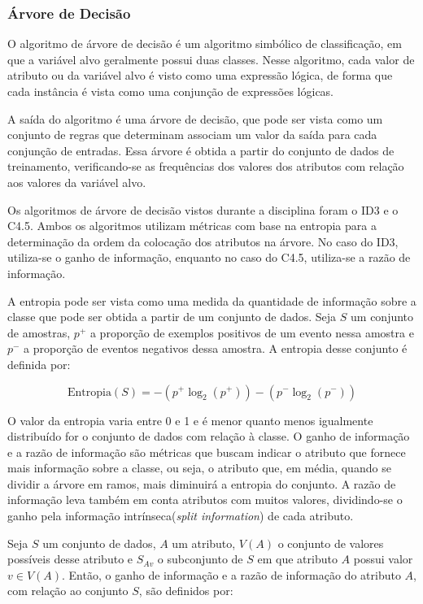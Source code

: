 \documentclass{article}
\begin{document}
\subsubsection{Árvore de Decisão}

O algoritmo de árvore de decisão é um algoritmo simbólico de classificação, em que a variável alvo geralmente possui duas classes. Nesse algoritmo, cada valor de atributo ou da variável alvo é visto como uma expressão lógica, de forma que cada instância é vista como uma conjunção de expressões lógicas.

A saída do algoritmo é uma árvore de decisão, que pode ser vista como um conjunto de regras que determinam associam um valor da saída para cada conjunção de entradas. Essa árvore é obtida a partir do conjunto de dados de treinamento, verificando-se as frequências dos valores dos atributos com relação aos valores da variável alvo.

Os algoritmos de árvore de decisão vistos durante a disciplina foram o ID3 e o C4.5. Ambos os algoritmos utilizam métricas com base na entropia para a determinação da ordem da colocação dos atributos na árvore. No caso do ID3, utiliza-se o ganho de informação, enquanto no caso do C4.5, utiliza-se a razão de informação.

A entropia pode ser vista como uma medida da quantidade de informação sobre a classe que pode ser obtida a partir de um conjunto de dados. Seja $S$ um conjunto de amostras, $p^+$ a proporção de exemplos positivos de um evento nessa amostra e $p^-$ a proporção de eventos negativos dessa amostra. A entropia desse conjunto é definida por:

\begin{equation}
\mathrm{Entropia}(S) = -(p^+ \log_2(p^+)) - (p^- \log_2(p^-))
\end{equation}

O valor da entropia varia entre 0 e 1 e é menor quanto menos igualmente distribuído for o conjunto de dados com relação à classe. O ganho de informação e a razão de informação são métricas que buscam indicar o atributo que fornece mais informação sobre a classe, ou seja, o atributo que, em média, quando se dividir a árvore em ramos, mais diminuirá a entropia do conjunto. A razão de informação leva também em conta atributos com muitos valores, dividindo-se o ganho pela informação intrínseca({\it split information}) de cada atributo.

Seja $S$ um conjunto de dados, $A$ um atributo, $V(A)$ o conjunto de valores possíveis desse atributo e $S_{Av}$ o subconjunto de $S$ em que atributo $A$ possui valor $v \in V(A)$. Então, o ganho de informação e a razão de informação do atributo $A$, com relação ao conjunto $S$, são definidos por:
\end{document}

